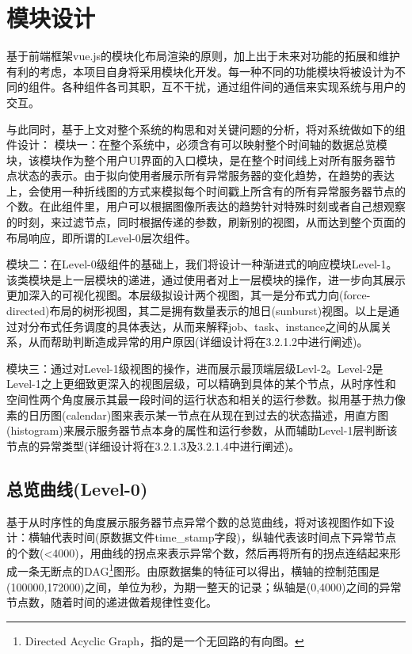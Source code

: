 \section{模块设计}

基于前端框架vue.js的模块化布局渲染的原则，加上出于未来对功能的拓展和维护有利的考虑，本项目自身将采用模块化开发。每一种不同的功能模块将被设计为不同的组件。各种组件各司其职，互不干扰，通过组件间的通信来实现系统与用户的交互。

与此同时，基于上文对整个系统的构思和对关键问题的分析，将对系统做如下的组件设计：
模块一：在整个系统中，必须含有可以映射整个时间轴的数据总览模块，该模块作为整个用户UI界面的入口模块，是在整个时间线上对所有服务器节点状态的表示。由于拟向使用者展示所有异常服务器的变化趋势，在趋势的表达上，会使用一种折线图的方式来模拟每个时间戳上所含有的所有异常服务器节点的个数。在此组件里，用户可以根据图像所表达的趋势针对特殊时刻或者自己想观察的时刻，来过滤节点，同时根据传递的参数，刷新别的视图，从而达到整个页面的布局响应，即所谓的Level-0层次组件。

模块二：在Level-0级组件的基础上，我们将设计一种渐进式的响应模块Level-1。该类模块是上一层模块的递进，通过使用者对上一层模块的操作，进一步向其展示更加深入的可视化视图。本层级拟设计两个视图，其一是分布式力向(force-directed)布局的树形视图，其二是拥有数量表示的旭日(sunburst)视图。以上是通过对分布式任务调度的具体表达，从而来解释job、task、instance之间的从属关系，从而帮助判断造成异常的用户原因(详细设计将在3.2.1.2中进行阐述)。

模块三：通过对Level-1级视图的操作，进而展示最顶端层级Levl-2。Level-2是Level-1之上更细致更深入的视图层级，可以精确到具体的某个节点，从时序性和空间性两个角度展示其最一段时间的运行状态和相关的运行参数。拟用基于热力像素的日历图(calendar)图来表示某一节点在从现在到过去的状态描述，用直方图(histogram)来展示服务器节点本身的属性和运行参数，从而辅助Level-1层判断该节点的异常类型(详细设计将在3.2.1.3及3.2.1.4中进行阐述)。

\subsection{总览曲线(Level-0)}

基于从时序性的角度展示服务器节点异常个数的总览曲线，将对该视图作如下设计：横轴代表时间(原数据文件time\_stamp字段)，纵轴代表该时间点下异常节点的个数(<4000)，用曲线的拐点来表示异常个数，然后再将所有的拐点连结起来形成一条无断点的DAG\footnote{Directed Acyclic Graph，指的是一个无回路的有向图。}图形。由原数据集的特征可以得出，横轴的控制范围是(100000,172000)之间，单位为秒，为期一整天的记录；纵轴是(0,4000)之间的异常节点数，随着时间的递进做着规律性变化。

